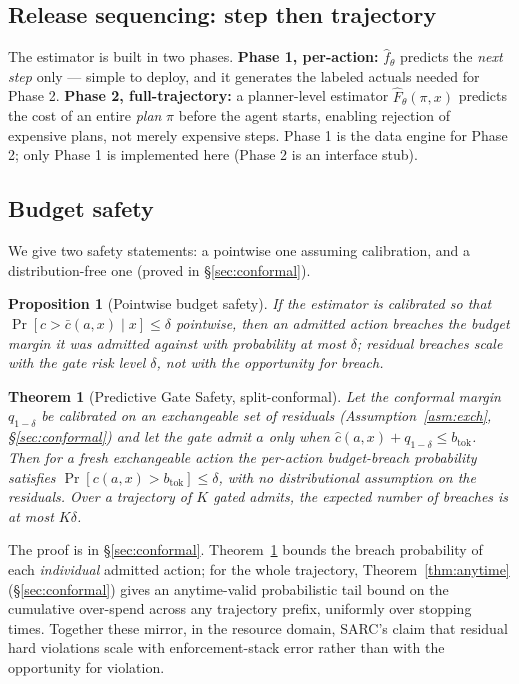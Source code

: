 \documentclass[11pt]{article}
\theoremstyle{plain}
\newtheorem{theorem}{Theorem}
\newtheorem{proposition}{Proposition}
\theoremstyle{definition}
\theoremstyle{remark}
\newcommand{\btok}{b_{\mathrm{tok}}}
\begin{document}
\subsection{Release sequencing: step then trajectory}
The estimator is built in two phases. \textbf{Phase 1, per-action:} $\hat f_\theta$ predicts the \emph{next step} only --- simple to deploy, and it generates the labeled actuals needed for Phase 2. \textbf{Phase 2, full-trajectory:} a planner-level estimator $\hat F_\theta(\pi,x)$ predicts the cost of an entire \emph{plan} $\pi$ before the agent starts, enabling rejection of expensive plans, not merely expensive steps. Phase 1 is the data engine for Phase 2; only Phase 1 is implemented here (Phase 2 is an interface stub).

\subsection{Budget safety}
We give two safety statements: a pointwise one assuming calibration, and a distribution-free one (proved in \S\ref{sec:conformal}).

\begin{proposition}[Pointwise budget safety]\label{prop:pointwise}
If the estimator is calibrated so that $\Pr[c > \bar c(a,x)\mid x] \le \delta$ pointwise, then an admitted action breaches the budget margin it was admitted against with probability at most $\delta$; residual breaches scale with the gate risk level $\delta$, not with the opportunity for breach.
\end{proposition}

\begin{theorem}[Predictive Gate Safety, split-conformal]\label{thm:safety}
Let the conformal margin $q_{1-\delta}$ be calibrated on an exchangeable set of residuals (Assumption~\ref{asm:exch}, \S\ref{sec:conformal}) and let the gate admit $a$ only when $\hat c(a,x) + q_{1-\delta} \le \btok$. Then for a fresh exchangeable action the per-action budget-breach probability satisfies $\Pr[c(a,x) > \btok] \le \delta$, with no distributional assumption on the residuals. Over a trajectory of $K$ gated admits, the expected number of breaches is at most $K\delta$.
\end{theorem}

\noindent The proof is in \S\ref{sec:conformal}. Theorem~\ref{thm:safety} bounds the breach probability of each \emph{individual} admitted action; for the whole trajectory, Theorem~\ref{thm:anytime} (\S\ref{sec:conformal}) gives an anytime-valid probabilistic tail bound on the cumulative over-spend across any trajectory prefix, uniformly over stopping times. Together these mirror, in the resource domain, SARC's claim that residual hard violations scale with enforcement-stack error rather than with the opportunity for violation.
\end{document}
